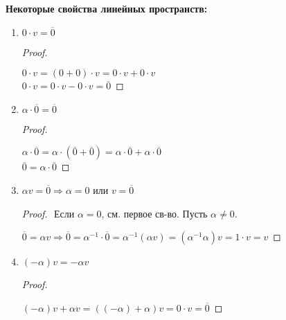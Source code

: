 \textbf{Некоторые свойства линейных пространств:}
\begin{enumerate}
    \item $0 \cdot v = \overline{0}$
    \begin{proof} $ $
        
        $0 \cdot v = (0 + 0) \cdot v = 0 \cdot v + 0 \cdot v$\\
        $0 \cdot v = 0 \cdot v - 0 \cdot v = \overline{0}$
    \end{proof}

    \item $\alpha \cdot \overline{0} = \overline{0}$
    \begin{proof} $ $

        $\alpha \cdot \overline{0} = \alpha \cdot (\overline{0} +
        \overline{0}) = \alpha \cdot \overline{0} + \alpha \cdot
        \overline{0}$ \\
        $\overline{0} = \alpha \cdot \overline{0}$
    \end{proof}

    \item $\alpha v = \overline{0} \Rightarrow \alpha = 0$ или 
    $v = \overline{0}$
    \begin{proof} $ $
        Если $\alpha = 0$, см. первое св-во.
        Пусть $\alpha \neq 0$.

        $\overline{0} = \alpha v \Rightarrow \overline{0} = \alpha^{-1} 
        \cdot \overline{0} = \alpha^{-1} (\alpha v) = 
        (\alpha^{-1} \alpha) v = 1 \cdot v = v$
    \end{proof}

    \item $(-\alpha) v = - \alpha v$
    \begin{proof} $ $

        $(-\alpha) v + \alpha v = ((-\alpha) + \alpha) v =
        0 \cdot v = \overline{0}$
    \end{proof}
\end{enumerate}